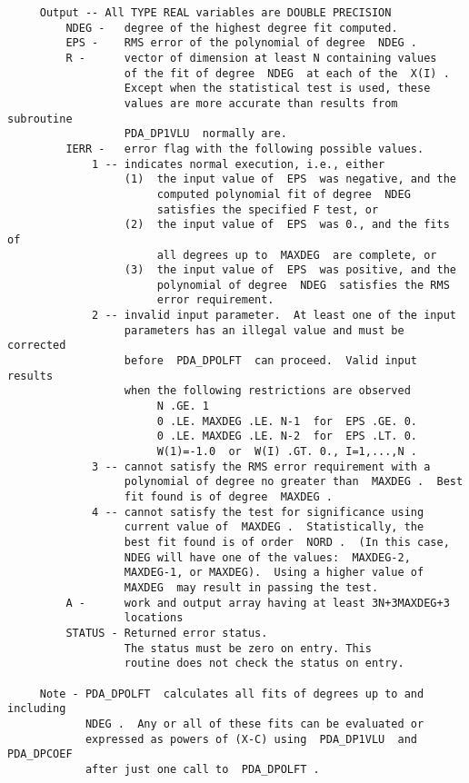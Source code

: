 \begin{verbatim}
     Output -- All TYPE REAL variables are DOUBLE PRECISION
         NDEG -   degree of the highest degree fit computed.
         EPS -    RMS error of the polynomial of degree  NDEG .
         R -      vector of dimension at least N containing values
                  of the fit of degree  NDEG  at each of the  X(I) .
                  Except when the statistical test is used, these
                  values are more accurate than results from subroutine
                  PDA_DP1VLU  normally are.
         IERR -   error flag with the following possible values.
             1 -- indicates normal execution, i.e., either
                  (1)  the input value of  EPS  was negative, and the
                       computed polynomial fit of degree  NDEG
                       satisfies the specified F test, or
                  (2)  the input value of  EPS  was 0., and the fits of
                       all degrees up to  MAXDEG  are complete, or
                  (3)  the input value of  EPS  was positive, and the
                       polynomial of degree  NDEG  satisfies the RMS
                       error requirement.
             2 -- invalid input parameter.  At least one of the input
                  parameters has an illegal value and must be corrected
                  before  PDA_DPOLFT  can proceed.  Valid input results
                  when the following restrictions are observed
                       N .GE. 1
                       0 .LE. MAXDEG .LE. N-1  for  EPS .GE. 0.
                       0 .LE. MAXDEG .LE. N-2  for  EPS .LT. 0.
                       W(1)=-1.0  or  W(I) .GT. 0., I=1,...,N .
             3 -- cannot satisfy the RMS error requirement with a
                  polynomial of degree no greater than  MAXDEG .  Best
                  fit found is of degree  MAXDEG .
             4 -- cannot satisfy the test for significance using
                  current value of  MAXDEG .  Statistically, the
                  best fit found is of order  NORD .  (In this case,
                  NDEG will have one of the values:  MAXDEG-2,
                  MAXDEG-1, or MAXDEG).  Using a higher value of
                  MAXDEG  may result in passing the test.
         A -      work and output array having at least 3N+3MAXDEG+3
                  locations
         STATUS - Returned error status.
                  The status must be zero on entry. This
                  routine does not check the status on entry.

     Note - PDA_DPOLFT  calculates all fits of degrees up to and including
            NDEG .  Any or all of these fits can be evaluated or
            expressed as powers of (X-C) using  PDA_DP1VLU  and  PDA_DPCOEF
            after just one call to  PDA_DPOLFT .


\end{verbatim}
